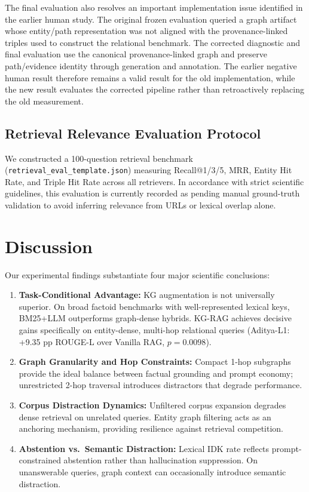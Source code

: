 \documentclass[conference]{IEEEtran}
\begin{document}
The final evaluation also resolves an important implementation issue identified in the earlier human study. The original frozen evaluation queried a graph artifact whose entity/path representation was not aligned with the provenance-linked triples used to construct the relational benchmark. The corrected diagnostic and final evaluation use the canonical provenance-linked graph and preserve path/evidence identity through generation and annotation. The earlier negative human result therefore remains a valid result for the old implementation, while the new result evaluates the corrected pipeline rather than retroactively replacing the old measurement.

\subsection{Retrieval Relevance Evaluation Protocol}
\label{sec:res_retrieval}

We constructed a 100-question retrieval benchmark (\texttt{retrieval\_eval\_template.json}) measuring Recall@1/3/5, MRR, Entity Hit Rate, and Triple Hit Rate across all retrievers. In accordance with strict scientific guidelines, this evaluation is currently recorded as pending manual ground-truth validation to avoid inferring relevance from URLs or lexical overlap alone.

\section{Discussion}
\label{sec:discussion}

Our experimental findings substantiate four major scientific conclusions:
\begin{enumerate}
    \item \textbf{Task-Conditional Advantage:} KG augmentation is not universally superior. On broad factoid benchmarks with well-represented lexical keys, BM25+LLM outperforms graph-dense hybrids. KG-RAG achieves decisive gains specifically on entity-dense, multi-hop relational queries (Aditya-L1: +9.35 pp ROUGE-L over Vanilla RAG, $p=0.0098$).
    \item \textbf{Graph Granularity and Hop Constraints:} Compact 1-hop subgraphs provide the ideal balance between factual grounding and prompt economy; unrestricted 2-hop traversal introduces distractors that degrade performance.
    \item \textbf{Corpus Distraction Dynamics:} Unfiltered corpus expansion degrades dense retrieval on unrelated queries. Entity graph filtering acts as an anchoring mechanism, providing resilience against retrieval competition.
    \item \textbf{Abstention vs.\ Semantic Distraction:} Lexical IDK rate reflects prompt-constrained abstention rather than hallucination suppression. On unanswerable queries, graph context can occasionally introduce semantic distraction.
\end{enumerate}
\end{document}

